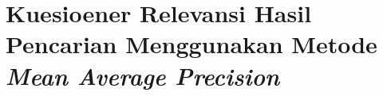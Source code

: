 \appendix
\chapter{Kuesioener Relevansi Hasil Pencarian Menggunakan Metode \emph{Mean Average Precision}}

